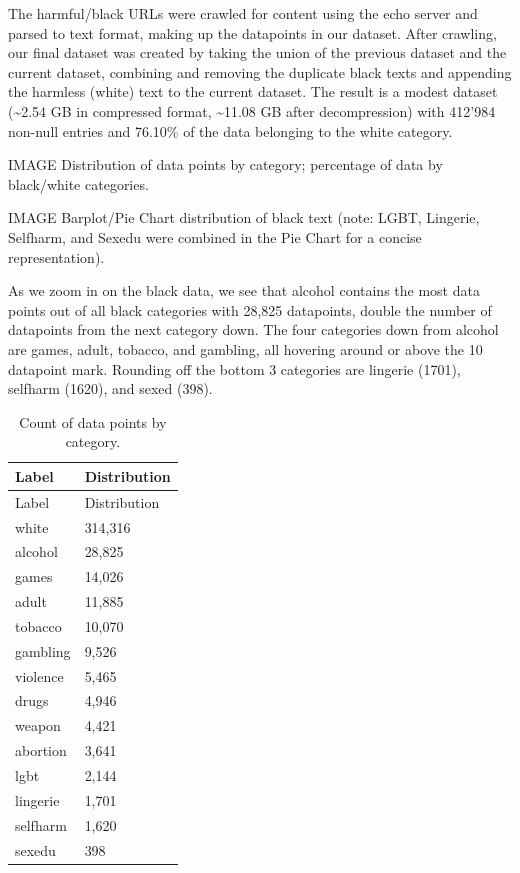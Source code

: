 \documentclass[
  titlepage]{article}
\begin{document}
The harmful/black URLs were crawled for content using the echo server
and parsed to text format, making up the datapoints in our dataset.
After crawling, our final dataset was created by taking the union of the
previous dataset and the current dataset, combining and removing the
duplicate black texts and appending the harmless (white) text to the
current dataset. The result is a modest dataset (\textasciitilde2.54 GB
in compressed format, \textasciitilde11.08 GB after decompression) with
412'984 non-null entries and 76.10\% of the data belonging to the white
category.

IMAGE Distribution of data points by category; percentage of data by
black/white categories.

IMAGE Barplot/Pie Chart distribution of black text (note: LGBT,
Lingerie, Selfharm, and Sexedu were combined in the Pie Chart for a
concise representation).

As we zoom in on the black data, we see that alcohol contains the most
data points out of all black categories with 28,825 datapoints, double
the number of datapoints from the next category down. The four
categories down from alcohol are games, adult, tobacco, and gambling,
all hovering around or above the 10 datapoint mark. Rounding off the
bottom 3 categories are lingerie (1701), selfharm (1620), and sexed
(398).

\begin{longtable}[]{@{}ll@{}}
\caption{Count of data points by category.}\tabularnewline
\toprule\noalign{}
Label & Distribution \\
\midrule\noalign{}
\endfirsthead
\toprule\noalign{}
Label & Distribution \\
\midrule\noalign{}
\endhead
\bottomrule\noalign{}
\endlastfoot
white & 314,316 \\
alcohol & 28,825 \\
games & 14,026 \\
adult & 11,885 \\
tobacco & 10,070 \\
gambling & 9,526 \\
violence & 5,465 \\
drugs & 4,946 \\
weapon & 4,421 \\
abortion & 3,641 \\
lgbt & 2,144 \\
lingerie & 1,701 \\
selfharm & 1,620 \\
sexedu & 398 \\
\end{longtable}
\end{document}
